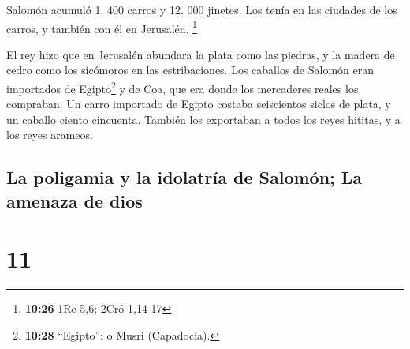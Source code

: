  Salomón acumuló 1. 400 carros y 12. 000 jinetes. Los
tenía en las ciudades de los carros, y también con él en Jerusalén.
\footnote{\textbf{10:26} 1Re 5,6; 2Cró 1,14-17}

 El rey hizo que en Jerusalén abundara la plata como las
piedras, y la madera de cedro como los sicómoros en las estribaciones.
 Los caballos de Salomón eran importados de
Egipto\footnote{\textbf{10:28} ``Egipto'': o Musri (Capadocia).} y de
Coa, que era donde los mercaderes reales los compraban. 
Un carro importado de Egipto costaba seiscientos siclos de plata, y un
caballo ciento cincuenta. También los exportaban a todos los reyes
hititas, y a los reyes arameos.

\hypertarget{la-poligamia-y-la-idolatruxeda-de-salomuxf3n-la-amenaza-de-dios}{%
\subsection{La poligamia y la idolatría de Salomón; La amenaza de
dios}\label{la-poligamia-y-la-idolatruxeda-de-salomuxf3n-la-amenaza-de-dios}}

\hypertarget{section-10}{%
\section{11}\label{section-10}}

